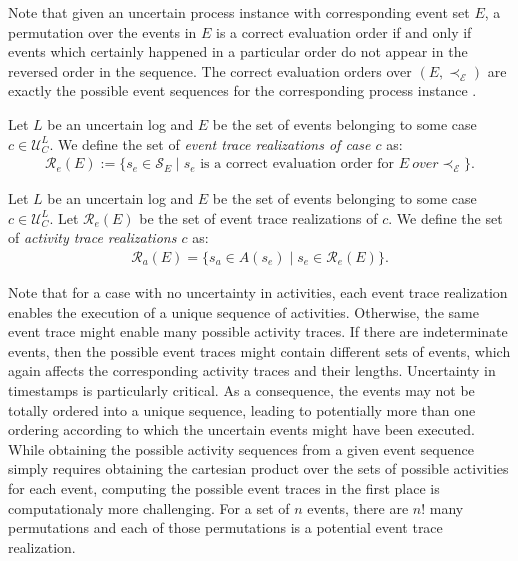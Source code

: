 Note that given an uncertain process instance with corresponding event set $E$, a permutation over the events in $E$ is a correct evaluation order if and only if events which certainly happened in a particular order do not appear in the reversed order in the sequence.
The correct evaluation orders over $(E,\prec_{\mathcal{E}})$ are exactly the possible event sequences for the corresponding process instance \cite{conformance}.

\begin{definition}\label{def: event trace realizations}
Let $L$ be an uncertain log and $E$ be the set of events belonging to some case $c \in \mathcal{U}_C^L$.
We define the set of \emph{event trace realizations of case $c$} as: 
\begin{align*}
\mathcal{R}_e(E) := \{
s_e \in \mathcal{S}_E \mid
s_e \text{ is a correct evaluation order for } E ~ over 
\prec_{\mathcal{E}}
\}.
\end{align*}
\end{definition}

\begin{definition}\label{def: activity trace realizations}
Let $L$ be an uncertain log and $E$ be the set of events belonging to some case $c \in \mathcal{U}_C^L$.
Let $\mathcal{R}_e(E)$ be the set of event trace realizations of $c$.
We define the set of \emph{activity trace realizations $c$} as: 
\begin{align*}
\mathcal{R}_a(E) = \{
 s_a \in A(s_e) \mid
s_e \in \mathcal{R}_e(E) 
 \}.
\end{align*}
\end{definition}


Note that for a case with no uncertainty in activities, each event trace realization enables the execution of a unique sequence of activities.
Otherwise, the same event trace might enable many possible activity traces.
If there are indeterminate events, then the possible event traces might contain different sets of events, which again affects the corresponding activity traces and their lengths.
Uncertainty in timestamps is particularly critical.
As a consequence, the events may not be totally ordered into a unique sequence, leading to potentially more than one ordering according to which the uncertain events might have been executed.
While obtaining the possible activity sequences from a given event sequence simply requires obtaining the cartesian product over the sets of  possible activities for each event, computing the possible event traces in the first place is computationaly more challenging.
For a set of $n$ events, there are $n!$ many permutations and each of those permutations is a potential event trace realization.

